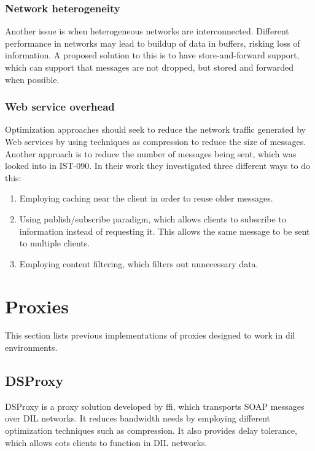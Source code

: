 \subsubsection{Network heterogeneity}

Another issue is when heterogeneous networks are interconnected. Different
performance in networks may lead to buildup of data in buffers, risking loss of
information. A proposed solution to this is to have store-and-forward support,
which can support that messages are not dropped, but stored and forwarded when
possible.


\subsubsection{Web service overhead}

Optimization approaches should seek to reduce the network traffic generated by
Web services by using techniques as compression to reduce the size of messages.
Another approach is to reduce the number of messages being sent, which was
looked into in IST-090\cite{ist-090}. In their work they investigated three
different ways to do this:

\begin{enumerate}
    \item Employing caching near the client in order to reuse older messages.
    \item Using publish/subscribe paradigm, which allows clients to subscribe to
    information instead of requesting it. This allows the same message to be sent
    to multiple clients.
    \item Employing content filtering, which filters out unnecessary data.
\end{enumerate}


\section{Proxies}

This section lists previous implementations of proxies designed to work in
\gls{dil} environments.


\subsection{DSProxy}

DSProxy is a proxy solution developed by \gls{ffi}, which transports SOAP
messages over DIL networks. It reduces bandwidth needs by employing different
optimization techniques such as compression. It also provides delay tolerance,
which allows \gls{cots} clients to function in DIL networks.


